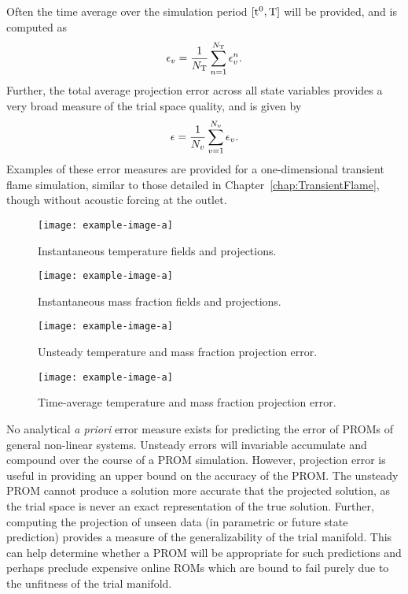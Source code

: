 Often the time average over the simulation period $[\text{t}^0, \text{T}]$ will be provided, and is computed as
%
\begin{equation}
    \epsilon_{v} = \frac{1}{N_{\text{T}}} \sum_{n = 1}^{N_{\text{T}}} \epsilon_{v}^{n}.
\end{equation}
%
Further, the total average projection error across all state variables provides a very broad measure of the trial space quality, and is given by
%
\begin{equation}
    \epsilon = \frac{1}{N_{v}} \sum_{v = 1}^{N_{v}} \epsilon_{v}.
\end{equation}
%
Examples of these error measures are provided for a one-dimensional transient flame simulation, similar to those detailed in Chapter~\ref{chap:TransientFlame}, though without acoustic forcing at the outlet.
%
\begin{figure}
    \begin{minipage}{0.45\linewidth}
        \texttt{[image: example-image-a]}
        \caption{\label{fig:projErrTempField}Instantaneous temperature fields and projections.}
    \end{minipage}
    \hspace{1em}
    \begin{minipage}{0.45\linewidth}
        \texttt{[image: example-image-a]}
        \caption{\label{fig:projErrMFField}Instantaneous mass fraction fields and projections.}
    \end{minipage}
\end{figure}
%
\begin{figure}
    \begin{minipage}{0.45\linewidth}
        \texttt{[image: example-image-a]}
        \caption{\label{fig:projErrTime}Unsteady temperature and mass fraction projection error.}
    \end{minipage}
    \hspace{1em}
    \begin{minipage}{0.45\linewidth}
        \texttt{[image: example-image-a]}
        \caption{\label{fig:projErrAvg}Time-average temperature and mass fraction projection error.}
    \end{minipage}
\end{figure}
%

No analytical \textit{a priori} error measure exists for predicting the error of PROMs of general non-linear systems. Unsteady errors will invariable accumulate and compound over the course of a PROM simulation. However, projection error is useful in providing an upper bound on the accuracy of the PROM. The unsteady PROM cannot produce a solution more accurate that the projected solution, as the trial space is never an exact representation of the true solution. Further, computing the projection of unseen data (in parametric or future state prediction) provides a measure of the generalizability of the trial manifold. This can help determine whether a PROM will be appropriate for such predictions and perhaps preclude expensive online ROMs which are bound to fail purely due to the unfitness of the trial manifold.